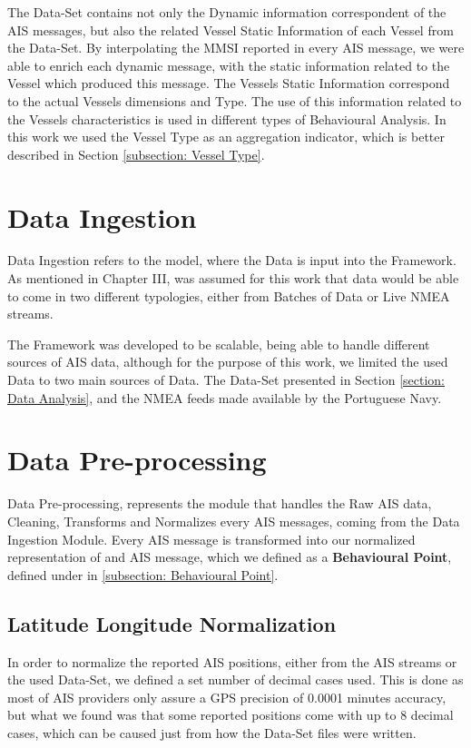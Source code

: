 The Data-Set contains not only the Dynamic information correspondent of the AIS messages, but also the related Vessel Static Information of each Vessel from the Data-Set. By interpolating the MMSI reported in every AIS message, we were able to enrich each dynamic message, with the static information related to the Vessel which produced this message. The Vessels Static Information correspond to the actual Vessels dimensions and Type. The use of this information related to the Vessels characteristics is used in different types of Behavioural Analysis. In this work we used the Vessel Type as an aggregation indicator, which is better described in Section \ref{subsection: Vessel Type}.

\section{Data Ingestion}
\todo[inline]{}
Data Ingestion refers to the model, where the Data is input into the Framework. As mentioned in Chapter III, was assumed for this work that data would be able to come in two different typologies, either from Batches of Data or Live NMEA streams. 

The Framework was developed to be scalable, being able to handle different sources of AIS data, although for the purpose of this work, we limited the used Data to two main sources of Data. The Data-Set presented in Section \ref{section: Data Analysis}, and the NMEA feeds made available by the Portuguese Navy.




\section{Data Pre-processing}
Data Pre-processing, represents the module that handles the Raw AIS data, Cleaning, Transforms and Normalizes every AIS messages, coming from the Data Ingestion Module. Every AIS message is transformed into our normalized representation of and AIS message, which we defined as a \textbf{Behavioural Point}, defined under in \ref{subsection: Behavioural Point}.

\subsection{Latitude Longitude Normalization}
In order to normalize the reported AIS positions, either from the AIS streams or the used Data-Set, we defined a set number of decimal cases used. This is done as most of AIS providers only assure a GPS precision of 0.0001 minutes accuracy, but what we found was that some reported positions come with up to 8 decimal cases, which can be caused just from how the Data-Set files were written.

